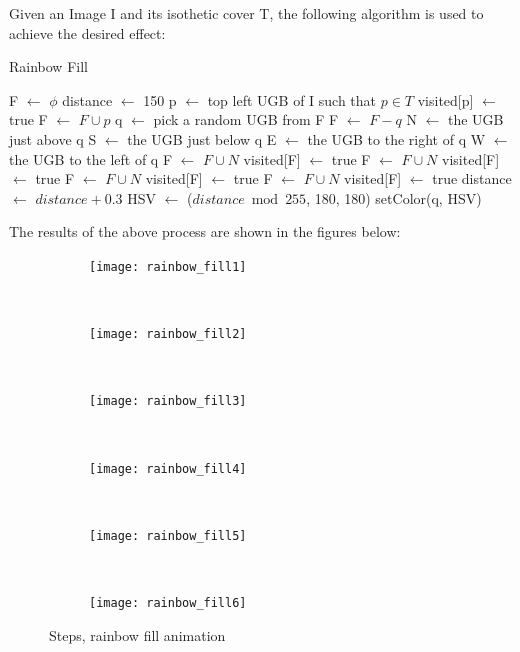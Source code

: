 \documentclass[12pt]{article}
\begin{document}
Given an Image I and its isothetic cover T, the following algorithm is used to achieve the desired effect:
\begin{algorithm}
\emph{}\caption{Rainbow Fill}
	\begin{algorithmic}[1]
	\State F $\longleftarrow$ $\phi$
	\State distance $\longleftarrow$ 150
	\State p $\longleftarrow$ top left UGB of I such that $p \in T$
	\State visited[p] $\longleftarrow$ true
	\State F $\longleftarrow$ $F \cup p $
		\State q $\longleftarrow$ pick a random UGB from F
		\State F $\longleftarrow$ $F - q$
		\State N $\longleftarrow$ the UGB just above q
		\State S $\longleftarrow$ the UGB just below q
		\State E $\longleftarrow$ the UGB to the right of q
		\State W $\longleftarrow$ the UGB to the left of q
			\State F $\longleftarrow$ $F \cup N$
			\State visited[F] $\longleftarrow$ true 
		\EndIf
			\State F $\longleftarrow$ $F \cup N$
			\State visited[F] $\longleftarrow$ true 
		\EndIf
			\State F $\longleftarrow$ $F \cup N$
			\State visited[F] $\longleftarrow$ true 
		\EndIf
			\State F $\longleftarrow$ $F \cup N$
			\State visited[F] $\longleftarrow$ true 
		\EndIf
		\State distance $\longleftarrow$ $distance+0.3$
		\State HSV $\longleftarrow$ ($distance \bmod 255$, 180, 180)
		\State setColor(q, HSV)
	\EndWhile
	\EndProcedure
	\end{algorithmic}
\end{algorithm}

The results of the above process are shown in the figures below:
\begin{figure}[H]
	\begin{subfigure}[b]{0.3\textwidth}
		\texttt{[image: rainbow\_fill1]}
	\end{subfigure}
	~
	\begin{subfigure}[b]{0.3\textwidth}
		\texttt{[image: rainbow\_fill2]}
	\end{subfigure}
	~
	\begin{subfigure}[b]{0.3\textwidth}
		\texttt{[image: rainbow\_fill3]}
	\end{subfigure}\centering
	~
	\begin{subfigure}[b]{0.3\textwidth}
		\texttt{[image: rainbow\_fill4]}
	\end{subfigure}
	~
	\begin{subfigure}[b]{0.3\textwidth}
		\texttt{[image: rainbow\_fill5]}
	\end{subfigure}
	~
	\begin{subfigure}[b]{0.3\textwidth}
		\texttt{[image: rainbow\_fill6]}
	\end{subfigure}
	\caption{Steps, rainbow fill animation}
	\label{fig:fig_rainbow_fill}
\end{figure}
\end{document}
